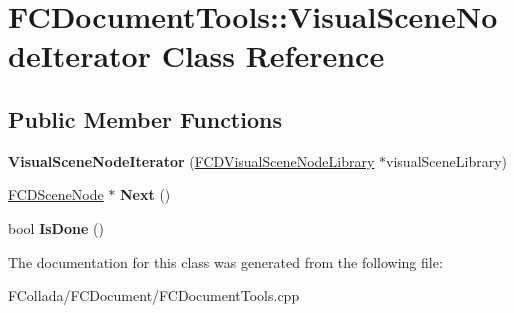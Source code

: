 \hypertarget{classFCDocumentTools_1_1VisualSceneNodeIterator}{
\section{FCDocumentTools::VisualSceneNodeIterator Class Reference}
\label{classFCDocumentTools_1_1VisualSceneNodeIterator}
}
\subsection*{Public Member Functions}
\begin{DoxyCompactItemize}
\item 
\hypertarget{classFCDocumentTools_1_1VisualSceneNodeIterator_af5bf76449171940c246d172aee8e457a}{
{\bfseries VisualSceneNodeIterator} (\hyperlink{classFCDLibrary}{FCDVisualSceneNodeLibrary} $\ast$visualSceneLibrary)}
\label{classFCDocumentTools_1_1VisualSceneNodeIterator_af5bf76449171940c246d172aee8e457a}

\item 
\hypertarget{classFCDocumentTools_1_1VisualSceneNodeIterator_a72019c55aa292ffac93b077bd2b7ebda}{
\hyperlink{classFCDSceneNode}{FCDSceneNode} $\ast$ {\bfseries Next} ()}
\label{classFCDocumentTools_1_1VisualSceneNodeIterator_a72019c55aa292ffac93b077bd2b7ebda}

\item 
\hypertarget{classFCDocumentTools_1_1VisualSceneNodeIterator_a723a26ab48eea172682d84c39108110b}{
bool {\bfseries IsDone} ()}
\label{classFCDocumentTools_1_1VisualSceneNodeIterator_a723a26ab48eea172682d84c39108110b}

\end{DoxyCompactItemize}


The documentation for this class was generated from the following file:\begin{DoxyCompactItemize}
\item 
FCollada/FCDocument/FCDocumentTools.cpp\end{DoxyCompactItemize}
